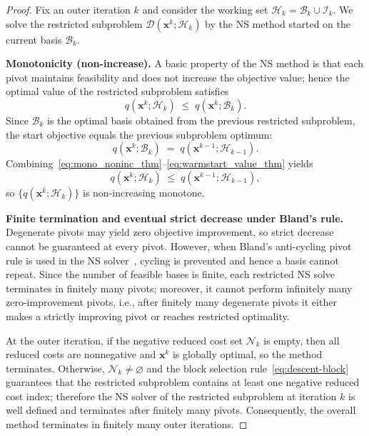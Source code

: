 \documentclass[12pt,a4paper]{article}
\begin{document}
\begin{proof}
Fix an outer iteration $k$ and consider the working set $\mathcal{H}_k=\mathcal{B}_k\cup\mathcal{I}_k$.
We solve the restricted subproblem $\mathcal{D}(\mathbf{x}^k;\mathcal{H}_k)$ by the NS method started on the current basis $\mathcal{B}_k$.

\medskip
\noindent\textbf{Monotonicity (non-increase).}
A basic property of the NS method is that each pivot maintains feasibility and does not
increase the objective value; hence the optimal value of the restricted subproblem satisfies
\begin{equation}\label{eq:mono_noninc_thm}
q(\mathbf{x}^k;\mathcal{H}_k)\;\le\; q(\mathbf{x}^k;\mathcal{B}_k).
\end{equation}
Since $\mathcal{B}_k$ is the optimal basis obtained from the previous restricted subproblem, the start objective equals the previous subproblem optimum:
\begin{equation}\label{eq:warmstart_value_thm}
q(\mathbf{x}^k;\mathcal{B}_k)\;=\; q(\mathbf{x}^{k-1};\mathcal{H}_{k-1}).
\end{equation}
Combining~\eqref{eq:mono_noninc_thm}--\eqref{eq:warmstart_value_thm} yields
\[
q(\mathbf{x}^k;\mathcal{H}_k)\;\le\; q(\mathbf{x}^{k-1};\mathcal{H}_{k-1}),
\]
so $\{q(\mathbf{x}^k;\mathcal{H}_k)\}$ is non-increasing monotone.

\medskip
\noindent\textbf{Finite termination and eventual strict decrease under Bland's rule.}
Degenerate pivots may yield zero objective improvement, so strict decrease cannot be guaranteed at every pivot.
However, when Bland's anti-cycling pivot rule is used in the NS solver~\cite{bland1977new},
cycling is prevented and hence a basis cannot repeat. Since the number of feasible bases is finite,
each restricted NS solve terminates in finitely many pivots; moreover, it cannot perform
infinitely many zero-improvement pivots, i.e., after finitely many degenerate pivots it either makes a
strictly improving pivot or reaches restricted optimality.

At the outer iteration, if the negative reduced cost set $\mathcal{N}_k$ is empty, then all reduced costs are
nonnegative and $\mathbf{x}^k$ is globally optimal, so the method terminates.
Otherwise, $\mathcal{N}_k\neq\varnothing$ and the block selection rule~\eqref{eq:descent-block} guarantees that the
restricted subproblem contains at least one negative reduced cost index; therefore the NS solver of the restricted subproblem at iteration $k$ is well defined and
terminates after finitely many pivots.
Consequently, the overall method terminates in finitely many outer iterations.


\end{proof}
\end{document}
